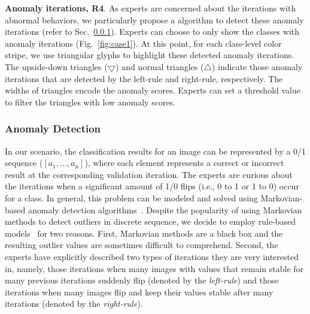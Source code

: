 \documentclass[format=acmsmall, review=false, screen=true]{acmart}
\newcommand{\ti}{\textcolor[rgb]{0,0,0}}
\begin{document}
\textbf{Anomaly iterations, R4}. \ti{As experts are concerned about the iterations with abnormal behaviors, we particularly propose a algorithm to detect these anomaly iterations (refer to Sec.~\ref{sec:anomaly}).
Experts can choose to only show the classes with anomaly iterations (Fig.~\ref{fig:case1}).
At this point, for each class-level color stripe, we use triangular glyphs to highlight these detected anomaly iterations.
The upside-down triangles ($\bigtriangledown$) and normal triangles ($\triangle$) indicate those anomaly iterations that are detected by the left-rule and right-rule, respectively.
The widths of triangles encode the anomaly scores. 
Experts can set a threshold value to filter the triangles with low anomaly scores.}\subsubsection{Anomaly Detection}\label{sec:anomaly}%
In our scenario, the classification results for an image can be represented by a 0/1 sequence ($[a_1, ..., a_n]$), where each element represents a correct or incorrect result at the corresponding validation iteration.
The experts are curious about the iterations when a significant amount of 1/0 flips (i.e., 0 to 1 or 1 to 0) occur for a class.
In general, this problem can be modeled and solved using Markovian-based anomaly detection algorithms~\cite{aggarwal2015outlier}.
Despite the popularity of using Markovian methods to detect outliers in discrete sequence, we decide to employ rule-based models~\cite{aggarwal2015outlier} for two reasons.
First, Markovian methods are a black box and the resulting outlier values are sometimes difficult to comprehend. Second, the experts have explicitly described two types of iterations they are very interested in, namely, those iterations when many images with values that remain stable for many previous iterations suddenly flip (denoted by the \textit{left-rule}) and those iterations when many images flip and keep their values stable after many iterations (denoted by the \textit{right-rule}).
\end{document}
